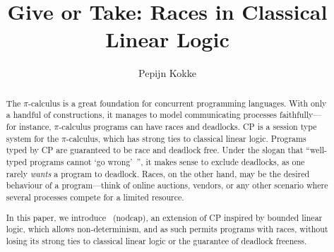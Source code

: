 \documentclass[a4paper,UKenglish]{lipics-v2016}
\title{Give or Take: Races in Classical Linear Logic}%
\author[1]{Pepijn Kokke}%
\affil[1]{LFCS, University of Edinburgh, Edinburgh, United Kingdom\\
  \texttt{pepijn.kokke@ed.ac.uk}}%
\begin{document}
\maketitle

\begin{abstract}
  The $\pi$-calculus is a great foundation for concurrent programming languages.
  With only a handful of constructions, it manages to model communicating
  processes faithfully---for instance, $\pi$-calculus programs can have races
  and deadlocks.
  CP is a session type system for the $\pi$-calculus, which has strong ties to
  classical linear logic. Programs typed by CP are guaranteed to be race and
  deadlock free.
  Under the slogan that ``well-typed programs cannot `go wrong'\!~'', it makes
  sense to exclude deadlocks, as one rarely \emph{wants} a program to deadlock. 
  Races, on the other hand, may be the desired behaviour of a program---think
  of online auctions, vendors, or any other scenario where several processes
  compete for a limited resource.

  In this paper, we introduce \nodcap\ (nodcap), an extension of CP inspired by
  bounded linear logic, which allows non-determinism, and as
  such permits programs with races, without losing its strong ties to classical
  linear logic or the guarantee of deadlock freeness. 
\end{abstract}
\end{document}
